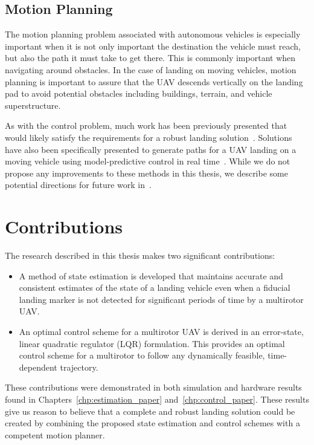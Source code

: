 \subsection{Motion Planning}
The motion planning problem associated with autonomous vehicles is especially
important when it is not only important the destination the vehicle must reach,
but also the path it must take to get there. This is commonly important when
navigating around obstacles. In the case of landing on moving vehicles, motion
planning is important to assure that the UAV descends vertically on the
landing pad to avoid potential obstacles including buildings, terrain, and
vehicle superstructure.

As with the control problem, much work has been previously presented that would
likely satisfy the requirements for a robust landing
solution~\cite{mellinger2011minimum}. Solutions have also been specifically
presented to generate paths for a UAV landing on a moving
vehicle using model-predictive control in real time~\cite{baca2019autonomous}.
While we do not propose any improvements to these methods in this thesis, we
describe some potential directions for future work in~.

\section{Contributions}
The research described in this thesis makes two significant contributions:
\begin{itemize}
\item A method of state estimation is developed that maintains accurate and
  consistent estimates of the state of a landing vehicle even when a fiducial landing
  marker is not detected for significant periods of time by a multirotor UAV.
\item An optimal control scheme for a multirotor UAV is derived in an error-state, linear
  quadratic regulator (LQR) formulation. This provides an optimal control scheme
  for a multirotor to follow any dynamically feasible, time-dependent
  trajectory.
\end{itemize}

These contributions were demonstrated in both simulation and hardware
results found in Chapters~\ref{chp:estimation_paper}
and~\ref{chp:control_paper}. These results give us reason to believe that a
complete and robust landing solution could be created by combining the proposed
state estimation and control schemes with a competent motion planner.

